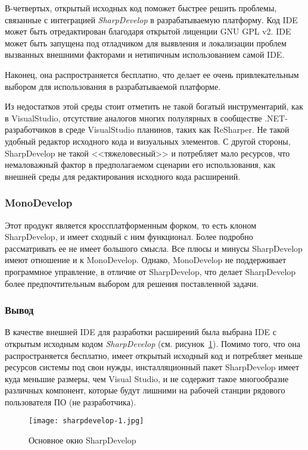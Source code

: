 В-четвертых, открытый исходных код поможет быстрее решить проблемы, связанные с интеграцией {\it SharpDevelop} в разрабатываемую платформу. Код IDE может быть отредактирован благодаря открытой лиценции GNU GPL v2. IDE может быть запущена под отладчиком для выявления и локализации проблем вызванных внешними факторами и нетипичным использованием самой IDE.

Наконец, она распространяется бесплатно, что делает ее очень привлекательным выбором для использования в разрабатываемой платформе.

Из недостатков этой среды стоит отметить не такой богатый инструментарий, как в VisualStudio, отсутствие аналогов многих полулярных в сообществе .NET-разработчиков в среде  VisualStudio планинов, таких как ReSharper. Не такой удобный редактор исходного кода и визуальных элементов. С другой стороны, SharpDevelop не такой <<тяжеловесный>> и потребляет мало ресурсов, что немаловажный фактор в предполагаемом сценарии его использования, как внешней среды для редактирования исходного кода расширений.

\subsubsection{MonoDevelop}

Этот продукт является кроссплатформенным форком, то есть клоном SharpDevelop, и имеет сходный с ним функционал. Более подробно рассматривать ее не имеет большого смысла. Все плюсы и минусы SharpDevelop имеют отношение и к MonoDevelop. Однако, MonoDevelop не поддерживает программное управление, в отличие от SharpDevelop, что делает SharpDevelop более предпочтительным выбором для решения поставленной задачи.

\subsubsection{Вывод}

В качестве внешней IDE для разработки расширений была выбрана IDE с открытым исходным кодом {\it SharpDevelop} (см. рисунок~\ref{pic:sharpdevelop-main-wnd}). Помимо того, что она распространяется бесплатно, имеет открытый исходный код и потребляет меньше ресурсов системы под свои нужды, инсталляционный пакет SharpDevelop имеет куда меньшие размеры, чем Visual Studio, и не содержит такое многообразие различных компонент, которые будут лишними на рабочей станции рядового пользователя ПО (не разработчика).

\begin{figure}[!h]
    \centering
    \texttt{[image: sharpdevelop-1.jpg]}
    \caption{Основное окно SharpDevelop}
    \label{pic:sharpdevelop-main-wnd}
\end{figure} 

\pagebreak
